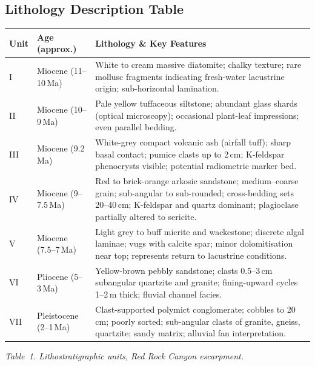\subsection{Lithology Description Table}

\begin{tabularx}{\linewidth}{@{} l l >{\raggedright\arraybackslash}X @{}}
\toprule
\textbf{Unit} & \textbf{Age (approx.)} & \textbf{Lithology \& Key Features} \\
\midrule
I   & Miocene (11--10\,Ma)  & White to cream massive diatomite; chalky texture; rare mollusc fragments indicating fresh-water lacustrine origin; sub-horizontal lamination. \\
\addlinespace[2pt]
II  & Miocene (10--9\,Ma)   & Pale yellow tuffaceous siltstone; abundant glass shards (optical microscopy); occasional plant-leaf impressions; even parallel bedding. \\
\addlinespace[2pt]
III & Miocene (9.2\,Ma)    & White-grey compact volcanic ash (airfall tuff); sharp basal contact; pumice clasts up to 2\,cm; K-feldspar phenocrysts visible; potential radiometric marker bed. \\
\addlinespace[2pt]
IV  & Miocene (9--7.5\,Ma)  & Red to brick-orange arkosic sandstone; medium--coarse grain; sub-angular to sub-rounded; cross-bedding sets 20--40\,cm; K-feldspar and quartz dominant; plagioclase partially altered to sericite. \\
\addlinespace[2pt]
V   & Miocene (7.5--7\,Ma)  & Light grey to buff micrite and wackestone; discrete algal laminae; vugs with calcite spar; minor dolomitisation near top; represents return to lacustrine conditions. \\
\addlinespace[2pt]
VI  & Pliocene (5--3\,Ma)   & Yellow-brown pebbly sandstone; clasts 0.5--3\,cm subangular quartzite and granite; fining-upward cycles 1--2\,m thick; fluvial channel facies. \\
\addlinespace[2pt]
VII & Pleistocene (2--1\,Ma) & Clast-supported polymict conglomerate; cobbles to 20\,cm; poorly sorted; sub-angular clasts of granite, gneiss, quartzite; sandy matrix; alluvial fan interpretation. \\
\bottomrule
\end{tabularx}
\vspace{3pt}
{\small\itshape\color{stone}Table~1. Lithostratigraphic units, Red Rock Canyon escarpment.}

